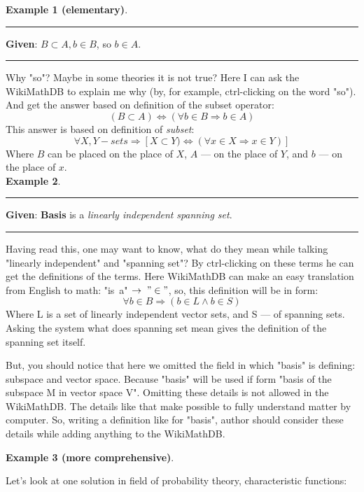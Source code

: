 \documentclass{article}
\begin{document}
{\bf Example 1 (elementary)}.\\

\hrule\bigskip

{\bf Given}: $B \subset A, b \in B$, so $b \in A$.\\

\hrule\bigskip

Why "so"? Maybe in some theories it is not true? Here I can ask the
WikiMathDB to explain me why (by, for example, ctrl-clicking on the
word "so"). And get the answer based on definition of the subset
operator:
$$(B \subset A) \Leftrightarrow (\forall b \in B \Rightarrow b \in
A)$$ This answer is based on definition of \textit{subset}:
$$\forall X,Y - sets \Rightarrow [X \subset Y) \Leftrightarrow
(\forall x \in X \Rightarrow x \in Y)]$$ Where $B$ can be placed on
the place of $X$, $A$ --- on the place of $Y$, and $b$ --- on the
place of $x$.
\\

{\bf Example 2}.\\

\hrule\bigskip

{\bf Given}: \textbf{Basis} is a \textit{linearly
independent} \textit{spanning set}.\\

\hrule\bigskip

Having read this, one may want to know, what do they mean while
talking "linearly independent" and "spanning set"? By ctrl-clicking
on these terms he can get the definitions of the terms. Here
WikiMathDB can make an easy translation from English to math: "is\
a"$\ \rightarrow\; "\in"$, so, this definition will be in form:
$$
\forall b \in B \Rightarrow (b \in L \wedge b \in S)
$$
Where L is a set of linearly independent vector sets, and S --- of
spanning sets. Asking the system what does spanning set mean gives
the definition of the spanning set itself.

But, you should notice that here we omitted the field in which
"basis" is defining: subspace and vector space. Because "basis" will
be used if form "basis of the subspace M in vector space V".
Omitting these details is not allowed in the WikiMathDB. The
details like that make possible to fully understand matter by
computer. So, writing a definition like for "basis", author should
consider these details while adding anything to the WikiMathDB.
\\
\newpage

{\bf Example 3 (more comprehensive)}.

Let's look at one solution in field of probability theory,
characteristic functions:\\
\end{document}
